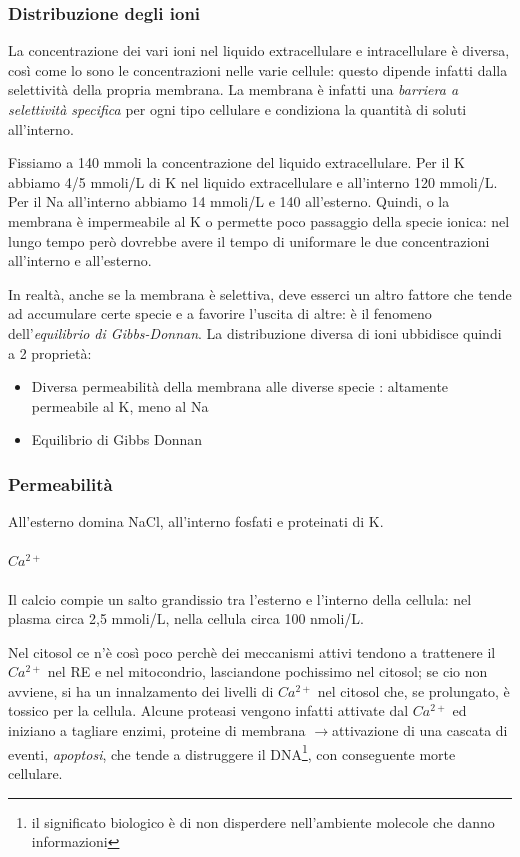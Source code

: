 \documentclass[a4paper,12pt]{article}
\newcommand{\lfreccia}{\ensuremath{\longrightarrow}}
\begin{document}
\subsubsection{Distribuzione degli ioni}

La concentrazione dei vari ioni nel liquido extracellulare e intracellulare è diversa, così come lo sono le concentrazioni nelle varie cellule: questo dipende infatti dalla selettività della propria membrana. La membrana è infatti una \emph{barriera a selettività specifica} per ogni tipo cellulare e condiziona la quantità di soluti all'interno.

Fissiamo a 140 mmoli la concentrazione del liquido extracellulare. Per il K abbiamo 4/5 mmoli/L di K nel liquido extracellulare e all'interno 120 mmoli/L. Per il Na all'interno abbiamo 14 mmoli/L e 140 all'esterno.
Quindi, o la membrana è impermeabile al K o permette poco passaggio della specie ionica: nel lungo tempo però dovrebbe avere il tempo di uniformare le due concentrazioni all'interno e all'esterno.

In realtà, anche se la membrana è selettiva, deve esserci un altro fattore che tende ad accumulare certe specie e a favorire l'uscita di altre: è il fenomeno dell'\emph{equilibrio di Gibbs-Donnan}. La distribuzione diversa di ioni ubbidisce quindi a 2 proprietà:
\begin{itemize}
\item{Diversa permeabilità della membrana alle diverse specie : altamente permeabile al K, meno al Na}
\item{Equilibrio di Gibbs Donnan}
\end{itemize}

\subsubsection{Permeabilità}
All'esterno domina NaCl, all'interno fosfati e proteinati di K.

\paragraph{$Ca^{2+}$}
Il calcio compie un salto grandissio tra l'esterno e l'interno della cellula: nel plasma circa 2,5 mmoli/L, nella cellula circa 100 nmoli/L.

Nel citosol ce n'è così poco perchè dei meccanismi attivi tendono a trattenere il $Ca^{2+}$ nel RE e nel mitocondrio, lasciandone pochissimo nel citosol; se cio non avviene, si ha un innalzamento dei livelli di $Ca^{2+}$ nel citosol che, se prolungato, è tossico per la cellula. Alcune proteasi vengono infatti attivate dal $Ca^{2+}$ ed iniziano a tagliare enzimi, proteine di membrana \lfreccia attivazione di una cascata di eventi, \emph{apoptosi}, che tende a distruggere il DNA\footnote{il significato biologico è di non disperdere nell'ambiente molecole che danno informazioni}, con conseguente morte cellulare.
\end{document}
